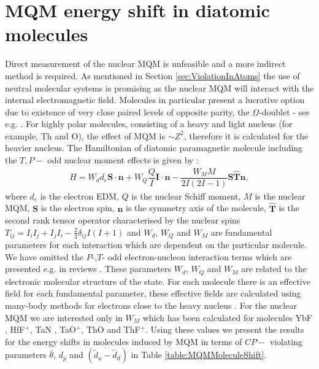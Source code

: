 \documentclass[10pt,a4paper, twoside, openright]{report}
\begin{document}
\section{MQM energy shift in diatomic molecules} \label{sec:MQMmolecule}
Direct measurement of the nuclear MQM is unfeasible and a more indirect method is required. As mentioned in Section \ref{sec:ViolationInAtoms} the use of neutral molecular systems is promising as the nuclear MQM will interact with the internal electromagnetic field. Molecules in particular present a lucrative option due to existence of very close paired levels of opposite parity, the  $\Omega$-doublet - see e.g.  \cite{Flambaum2014}. For highly polar molecules, consisting of a heavy and light nucleus (for example, Th and O), the effect of MQM is $\sim Z^2$, therefore it is calculated for the heavier nucleus. The Hamiltonian of diatomic paramagnetic molecule including the $T, P-$ odd nuclear moment effects is given by \cite{SFK1984,Kozlov1995}:
\begin{align}
H = W_d d_e \mathbf{S}\cdot\mathbf{n} + W_{Q}\dfrac{Q}{I}\mathbf{I}\cdot\mathbf{n} - \dfrac{W_{M}M}{2I(2I -1)}\mathbf{S}\hat{\mathbf{T}}\mathbf{n},
\end{align}
where $d_e$ is the electron EDM, $Q$ is the nuclear Schiff moment, $M$ is the nuclear MQM, $\mathbf{S}$ is the electron spin, $\mathbf{n}$ is the symmetry axis of the molecule, $\hat{\mathbf{T}} $ is the second rank tensor operator characterised by the nuclear spins $T_{ij} = I_iI_j + I_jI_i - \tfrac{2}{3}\delta_{ij}I(I + 1)$  and  $W_d$, $W_Q$ and $W_M$ are fundamental parameters for each interaction which are dependent on the particular molecule. We have omitted the $P$-,$T$- odd electron-nucleon interaction terms which are presented e.g. in reviews \cite{Safronova2017,GF2004}. 
These parameters $W_d$, $W_Q$ and $W_M$
are related to the electronic molecular structure of the state. For each molecule there is an effective field for each fundamental parameter, these effective fields are calculated using many-body methods for electrons close to the heavy nucleus \cite{Flambaum2014}.  For the nuclear MQM we are interested only in $W_M$ which has been calculated for molecules YbF \cite{Kozlov1995}, HfF$^{+}$\cite{Skripnikov2017}, TaN \cite{Skripnikov2015Ta, Fleig2016TaN}, TaO$^+$\cite{Fleig2018}, ThO \cite{Skripnikov2014ThO} and ThF$^+$\cite{Skripnikov2015Th}. 
Using these values we present the results for the energy shifts in molecules induced by MQM in terms of $CP-$ violating parameters $\bar{\theta}$, $d_p$  and $(\tilde{d}_u -\tilde{d}_d)$ in Table \ref{table:MQMMoleculeShift}. \\
\end{document}
